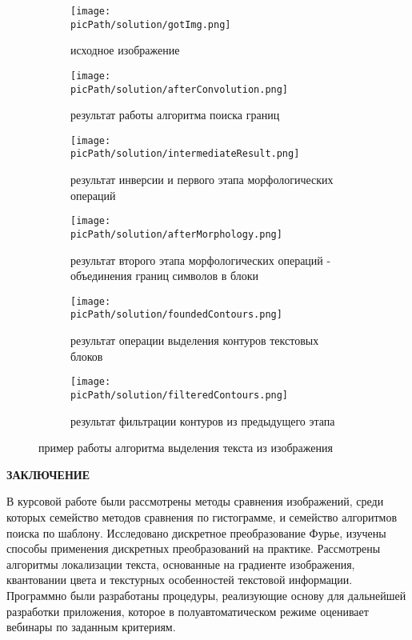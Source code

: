 \documentclass[oneside,final,14pt]{extreport}
\newcommand{\picPath}{pictures}
\begin{document}
\begin{figure}[H]
  \centering
  \begin{subfigure}[b]{0.48\linewidth}
    \texttt{[image: \\picPath/solution/gotImg.png]}
    \caption{исходное изображение \phantom{алгоритма поиска границ}}
  \end{subfigure}
  \begin{subfigure}[b]{0.48\linewidth}
    \texttt{[image: \\picPath/solution/afterConvolution.png]}
    \caption{результат работы алгоритма поиска границ}
  \end{subfigure}
  \begin{subfigure}[b]{0.48\linewidth}
    \texttt{[image: \\picPath/solution/intermediateResult.png]}
    \caption{результат инверсии и первого этапа морфологических операций \phantom{границ символов в блоки}}
  \end{subfigure}
  \begin{subfigure}[b]{0.48\linewidth}
    \texttt{[image: \\picPath/solution/afterMorphology.png]}
    \caption{результат второго этапа морфологических операций - объединения границ символов в блоки }
  \end{subfigure}
  \begin{subfigure}[b]{0.48\linewidth}
    \texttt{[image: \\picPath/solution/foundedContours.png]}
    \caption{результат операции выделения контуров текстовых блоков}
  \end{subfigure}
  \begin{subfigure}[b]{0.48\linewidth}
    \texttt{[image: \\picPath/solution/filteredContours.png]}
    \caption{результат фильтрации контуров из предыдущего этапа}
  \end{subfigure}
  \caption{пример работы алгоритма выделения текста из изображения}
  \label{Solution:text_loc}
\end{figure}

\newpage
{}
\begin{center}
\bfseries ЗАКЛЮЧЕНИЕ
\end{center}

В курсовой работе были рассмотрены методы сравнения изображений, среди которых семейство методов сравнения по гистограмме, и семейство алгоритмов поиска по шаблону.
Исследовано дискретное преобразование Фурье, изучены способы применения дискретных преобразований на практике. Рассмотрены алгоритмы локализации текста, основанные на градиенте изображения, квантовании цвета и текстурных особенностей текстовой информации.
Программно были разработаны процедуры, реализующие основу для дальнейшей разработки приложения, которое в полуавтоматическом режиме оценивает вебинары по заданным критериям.
\end{document}

